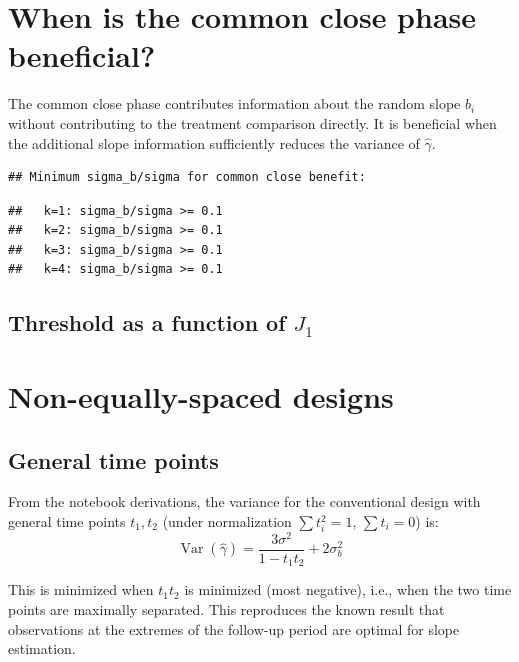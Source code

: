 \documentclass[
  11pt,
]{article}
\begin{document}
\section{When is the common close phase
beneficial?}\label{when-is-the-common-close-phase-beneficial}

The common close phase contributes information about the random slope
\(b_i\) without contributing to the treatment comparison directly. It is
beneficial when the additional slope information sufficiently reduces
the variance of \(\hat\gamma\).

\begin{verbatim}
## Minimum sigma_b/sigma for common close benefit:
\end{verbatim}

\begin{verbatim}
##   k=1: sigma_b/sigma >= 0.1
##   k=2: sigma_b/sigma >= 0.1
##   k=3: sigma_b/sigma >= 0.1
##   k=4: sigma_b/sigma >= 0.1
\end{verbatim}

\subsection{\texorpdfstring{Threshold as a function of
\(J_1\)}{Threshold as a function of J\_1}}\label{threshold-as-a-function-of-j_1}

\section{Non-equally-spaced designs}\label{non-equally-spaced-designs}

\subsection{General time points}\label{general-time-points}

From the notebook derivations, the variance for the conventional design
with general time points \(t_1, t_2\) (under normalization
\(\sum t_i^2 = 1\), \(\sum t_i = 0\)) is: \begin{equation}
  \mathop{\mathrm{Var}}(\hat\gamma) = \frac{3\sigma^2}{1 - t_1 t_2}
    + 2\sigma_b^2
\end{equation}

This is minimized when \(t_1 t_2\) is minimized (most negative), i.e.,
when the two time points are maximally separated. This reproduces the
known result that observations at the extremes of the follow-up period
are optimal for slope estimation.
\end{document}
